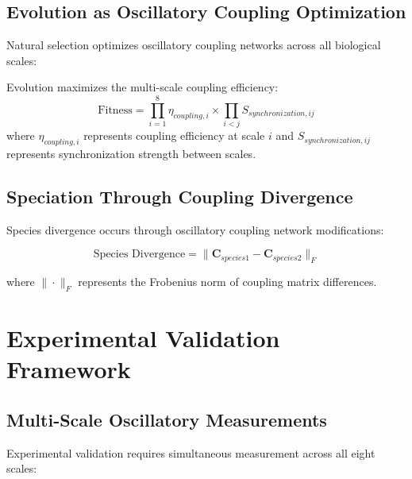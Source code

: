 \documentclass[twocolumn]{article}
\begin{document}
\subsection{Evolution as Oscillatory Coupling Optimization}

Natural selection optimizes oscillatory coupling networks across all biological scales:

\begin{theorem}
Evolution maximizes the multi-scale coupling efficiency:
\begin{equation}
\text{Fitness} = \prod_{i=1}^{8} \eta_{coupling,i} \times \prod_{i<j} S_{synchronization,ij}
\end{equation}
where $\eta_{coupling,i}$ represents coupling efficiency at scale $i$ and $S_{synchronization,ij}$ represents synchronization strength between scales.
\end{theorem}

\subsection{Speciation Through Coupling Divergence}

Species divergence occurs through oscillatory coupling network modifications:

\begin{equation}
\text{Species Divergence} = \|\mathbf{C}_{species1} - \mathbf{C}_{species2}\|_F
\end{equation}

where $\|\cdot\|_F$ represents the Frobenius norm of coupling matrix differences.

\section{Experimental Validation Framework}

\subsection{Multi-Scale Oscillatory Measurements}

Experimental validation requires simultaneous measurement across all eight scales:
\end{document}
